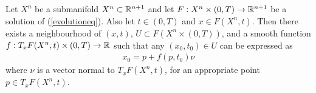 \begin{theorem}
	Let $X^n$ be a submanifold $X^n\subset\mathbb{R}^{n+1}$ and let $F:X^n\times(0, T)\rightarrow \mathbb{R}^{n+1}$ be a solution of (\ref{evolutioneq}). Also let $t\in(0, T)$ and $x\in F(X^n, t)$.
	Then there exists a neighbourhood of $(x, t)$, $U\subset F(X^n\times(0, T))$, and a smooth function $f: T_{x} F(X^n, t)\times(0, T)\rightarrow \mathbb{R}$ such that any $(x_0, t_0)\in U$ can be expressed as 
	\begin{align*}
		x_0= p +f(p, t_0) \nu 
	\end{align*}
	where $\nu$ is a vector normal to $T_{x} F(X^n, t)$, for an appropriate point $p\in T_x F(X^n, t)$. \label{localgraph}
\end{theorem}

